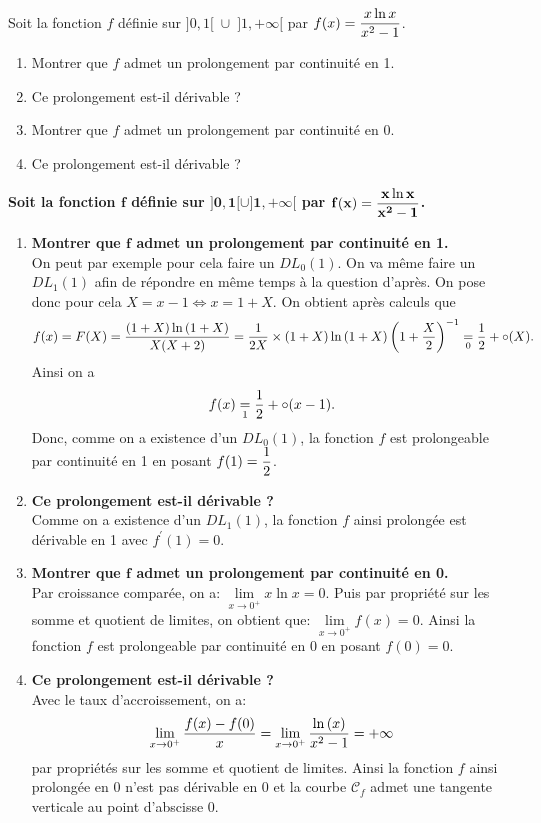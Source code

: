 \documentclass[a4paper, 11pt,reqno]{article}
\begin{document}
\begin{exercice}  \;
	Soit la fonction $f$ d\'efinie sur $\rbrack 0,1\lbrack \; \cup \; \rbrack 1,+\infty\lbrack$ par $f(x)=\displaystyle\frac{x\ln{x}}{x^2-1}$.
	\begin{enumerate}
		\item Montrer que $f$ admet un prolongement par continuit\'e en 1.
		\item Ce prolongement est-il d\'erivable ?
		\item Montrer que $f$ admet un prolongement par continuit\'e en 0.
		\item Ce prolongement est-il d\'erivable ?
	\end{enumerate}
\end{exercice}
\begin{correction} \;
	\textbf{Soit la fonction $\mathbf{f}$ d\'efinie sur $\mathbf{\rbrack 0,1\lbrack\cup\rbrack 1,+\infty\lbrack}$ par $\mathbf{f(x)=\displaystyle\frac{x\ln{x}}{x^2-1}}$.}
	\begin{enumerate}
		\item \textbf{Montrer que $\mathbf{f}$ admet un prolongement par continuit\'e en 1.}\\
		      \noindent On peut par exemple pour cela faire un $DL_0(1)$. On va m\^{e}me faire un $DL_1(1)$ afin de r\'epondre en m\^{e}me temps \`{a} la question d'apr\`{e}s. On pose donc pour cela $X=x-1\Leftrightarrow x=1+X$. On obtient apr\`{e}s calculs que
		      $$f(x)=F(X)=\displaystyle\frac{(1+X)\ln{(1+X)}}{X(X+2)}=\displaystyle\frac{1}{2X}\times (1+X)\ln{(1+X)}\left( 1+\displaystyle\frac{X}{2}\right)^{-1}
			      \underset{0}{=}\displaystyle\frac{1}{2} +\circ(X).$$
		      Ainsi on a
		      $$f(x)\underset{1}{=}\displaystyle\frac{1}{2}+\circ(x-1).$$
		      Donc, comme on a existence d'un $DL_0(1)$, la fonction $f$ est prolongeable par continuit\'e en 1 en posant $f(1)=\displaystyle\frac{1}{2}$.
		\item \textbf{Ce prolongement est-il d\'erivable ?}\\
		      \noindent Comme on a existence d'un $DL_1(1)$, la fonction $f$ ainsi prolong\'ee est d\'erivable en 1 avec $f^{\prime}(1)=0$.
		\item \textbf{Montrer que $\mathbf{f}$ admet un prolongement par continuit\'e en 0.}\\
		      \noindent Par croissance compar\'ee, on a: $\lim\limits_{x\to 0^+} x\ln{x}=0$. Puis par propri\'et\'e sur les somme et quotient de limites, on obtient que: $\lim\limits_{x\to 0^+} f(x)=0$. Ainsi la fonction $f$ est prolongeable par continuit\'e en 0 en posant $f(0)=0$.
		\item \textbf{Ce prolongement est-il d\'erivable ?}\\
		      \noindent Avec le taux d'accroissement, on a:
		      $$\lim\limits_{x\to 0^+} \displaystyle\frac{f(x)-f(0)}{x}=\lim\limits_{x\to 0^+}\displaystyle\frac{\ln{(x)}}{x^2-1}=+\infty$$
		      par propri\'et\'es sur les somme et quotient de limites. Ainsi la fonction $f$ ainsi prolong\'ee en 0 n'est pas d\'erivable en 0 et la courbe $\mathcal{C}_f$ admet une tangente verticale au point d'abscisse 0.
	\end{enumerate}
\end{correction}
\end{document}
